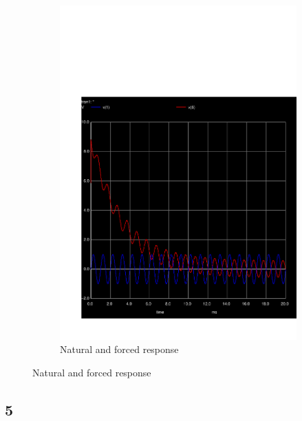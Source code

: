 \begin{figure}[h]
\begin{subfigure}{0.4\textwidth}
\includegraphics[width=\textwidth]{sim4.pdf}
\caption{Natural and forced response}
\label{fig:second}
\end{subfigure}

\end{figure}


\subsection{5}

